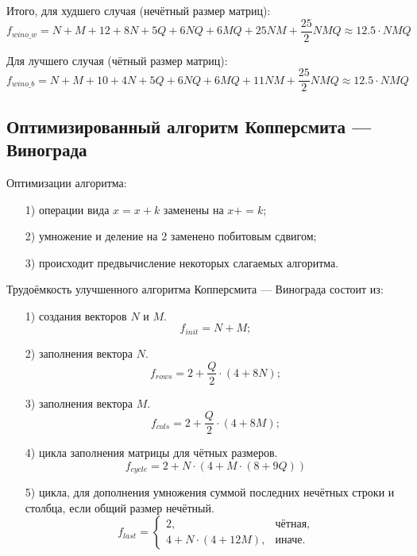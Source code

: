 \documentclass[12pt]{report}
\begin{document}
	Итого, для худшего случая (нечётный размер матриц): 
	\begin{equation}
	\label{for:bad}
	f_{wino\_w} = N + M + 12 + 8N + 5Q + 6NQ + 6MQ + 25NM + \frac{25}{2}NMQ \approx 12.5 \cdot NMQ
	\end{equation}

	Для лучшего случая (чётный размер матриц): 
	\begin{equation}
	\label{for:good}
	f_{wino\_b} = N + M + 10 + 4N + 5Q + 6NQ + 6MQ + 11NM + \frac{25}{2}NMQ \approx 12.5 \cdot NMQ
	\end{equation}

	\subsection{Оптимизированный алгоритм Копперсмита — Винограда}

	Оптимизации алгоритма:
	\begin{enumerate}
		\item[1)] операции вида $x = x + k$ заменены на $x += k$;
		\item[2)] умножение и деление на 2 заменено побитовым сдвигом;
		\item[3)] происходит предвычисление некоторых слагаемых алгоритма.
	\end{enumerate}
	
	Трудоёмкость улучшенного алгоритма Копперсмита — Винограда состоит из:
	\begin{enumerate}
		\item[1)] создания векторов $N$ и $M$.
		\begin{equation}
		\label{for:impr_init}
		f_{init} = N + M;
		\end{equation}
		
		\item[2)] заполнения вектора $N$.
		\begin{equation}
		\label{for:impr_MH}
		f_{rows} = 2 + \frac{Q}{2} \cdot (4 + 8N);
		\end{equation}
		
		\item[3)] заполнения вектора $M$.
		\begin{equation}
		\label{for:impr_MV}
		f_{cols} = 2 + \frac{Q}{2} \cdot (4 + 8M);
		\end{equation}
		
		\item[4)] цикла заполнения матрицы для чётных размеров.
		\begin{equation}
		\label{for:impr_cycle}
		f_{cycle} = 2 + N \cdot (4 + M \cdot (8 + 9Q))
		\end{equation}
		
		\item[5)] цикла, для дополнения умножения суммой последних нечётных строки и столбца, если общий размер нечётный.
		\begin{equation}
		\label{for:impr_last}
		f_{last} = 
		\begin{cases}
		2, & \text{чётная,}\\
		4 + N \cdot (4 + 12M), & \text{иначе.}
		\end{cases}
		\end{equation}
	\end{enumerate}
\end{document}
